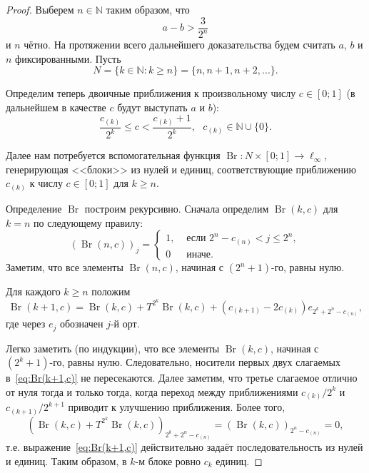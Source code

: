 \documentclass[a4paper,14pt]{article} %
\theoremstyle{plain}
\begin{document}
\begin{proof}
	Выберем $n\in\mathbb{N}$ таким образом, что
	\begin{equation}
		\label{eq:Omega_a_b_gap}
		a - b > \frac{3}{2^n}
	\end{equation}
	и $n$ чётно.
	На протяжении всего дальнейшего доказательства будем считать $a$, $b$ и $n$ фиксированными.
	Пусть
	\begin{equation}
		N = \{k\in\mathbb{N} : k \geq n\} = \{n, n+1, n+2, ...\}
		.
	\end{equation}

	Определим теперь двоичные приближения к произвольному числу $c\in[0;1]$
	(в дальнейшем в качестве $c$ будут выступать $a$ и $b$):
	\begin{equation}
		\label{eq:binary_approximations_for_number}
		\frac{c_{(k)}}{2^k} \leq c < \frac{c_{(k)}+1}{2^k}
		,
		~~~c_{(k)}\in\mathbb{N}\cup\{0\}
		.
	\end{equation}

	Далее нам потребуется вспомогательная функция $\operatorname{Br}:N\times [0;1] \to \ell_\infty$,
	генерирующая <<блоки>> из нулей и единиц, соответствующие приближению $c_{(k)}$ к числу $c\in[0;1]$ для $k \geq n$.

	Определение $\operatorname{Br}$ построим рекурсивно.
	Сначала определим $\operatorname{Br}(k,c)$ для $k=n$ по следующему правилу:
	\begin{equation}
		(\operatorname{Br}(n,c))_j = \begin{cases}
			1, & \mbox{~если~} 2^n - c_{(n)} < j \leq 2^n,
			\\
			0  & \mbox{~иначе}
			.
		\end{cases}
	\end{equation}
	Заметим, что все элементы $\operatorname{Br}(n,c)$, начиная с $(2^n+1)$-го, равны нулю.

	Для каждого $k \geq n$ положим
	\begin{equation}
		\label{eq:Br(k+1,c)}
		\operatorname{Br}(k+1,c) = \operatorname{Br}(k,c) + T^{2^k}\operatorname{Br}(k,c) + (c_{(k+1)}-2c_{(k)})e_{2^k+2^n-c_{(n)}}
		,
	\end{equation}
	где через $e_j$ обозначен $j$-й орт.

	Легко заметить (по индукции), что все элементы $\operatorname{Br}(k,c)$, начиная с $(2^k+1)$-го, равны нулю.
	Следовательно, носители первых двух слагаемых в~\eqref{eq:Br(k+1,c)} не пересекаются.
	Далее заметим, что третье слагаемое отлично от нуля тогда и только тогда,
	когда переход между приближениями $c_{(k)} / 2^k$ и $c_{(k+1)}/2^{k+1}$
	приводит к улучшению приближения.
	Более того,
	\begin{equation}
		\left(\operatorname{Br}(k,c) + T^{2^k}\operatorname{Br}(k,c)\right)_{2^k+2^n-c_{(n)}}
		=
		(\operatorname{Br}(k,c))_{2^n-c_{(n)}}
		=
		0
		,
	\end{equation}
	т.е. выражение~\eqref{eq:Br(k+1,c)} действительно задаёт последовательность из нулей и единиц.
	Таким образом, в $k$-м блоке ровно $c_k$ единиц.


\end{proof}
\end{document}
